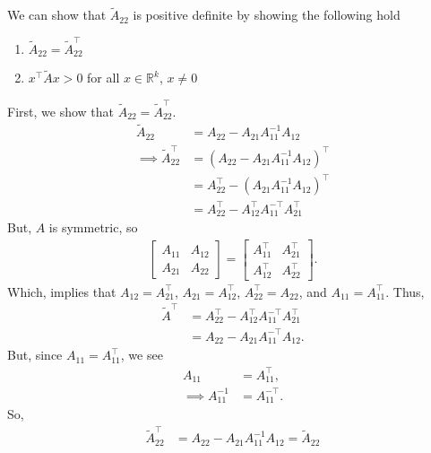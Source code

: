 \documentclass{report}
\begin{document}
\begin{remark}
    \bigbreak \noindent 
    We can show that $\tilde{A}_{22}$ is positive definite by showing the following hold
    \begin{enumerate}
        \item $\tilde{A}_{22} = \tilde{A}^{\top}_{22}$
        \item $x^{\top}\tilde{A}x > 0$ for all $x \in \mathbb{R}^{k}$, $x\ne 0$
    \end{enumerate}
    \bigbreak \noindent 
    First, we show that $\tilde{A}_{22} = \tilde{A}^{\top}_{22}$.
    \begin{align*}
        \tilde{A}_{22} &= A_{22} - A_{21}A_{11}^{-1}A_{12}  \\
        \implies \tilde{A}^{\top}_{22} &= (A_{22} - A_{21}A_{11}^{-1}A_{12})^{\top} \\
                                  &= A_{22}^{\top} -(A_{21}A_{11}^{-1}A_{12})^{\top} \\
                                  &=A_{22}^{\top} -A_{12}^{\top}A_{11}^{-\top}A_{21}^{\top}
    \end{align*}
    But, $A$ is symmetric, so
    \begin{align*}
        \begin{bmatrix}
            A_{11} & A_{12} \\
            A_{21} & A_{22}
        \end{bmatrix}
         = 
         \begin{bmatrix}
             A_{11}^{\top} & A_{21}^{\top} \\
             A_{12}^{\top} & A_{22}^{\top}
         \end{bmatrix}
    .\end{align*}
    Which, implies that $A_{12} = A_{21}^{\top}$, $A_{21} = A_{12}^{\top}$, $A_{22}^{\top} = A_{22}$, and $A_{11} = A_{11}^{\top} $. Thus,
    \begin{align*}
        \tilde{A}^{\top}&=A_{22}^{\top} -A_{12}^{\top}A_{11}^{-\top}A_{21}^{\top} \\
                        &= A_{22} - A_{21}A_{11}^{-\top}A_{12}
    .\end{align*}
    But, since $A_{11} = A_{11}^{\top}$, we see 
    \begin{align*}
        A_{11} &= A_{11}^{\top}, \\
        \implies A_{11}^{-1} &= A_{11}^{-\top} 
    .\end{align*}
    So,
    \begin{align*}
        \tilde{A}^{\top}_{22} &= A_{22} - A_{21}A_{11}^{-1}A_{12} = \tilde{A}_{22}

\end{align*}
\end{remark}
\end{document}
